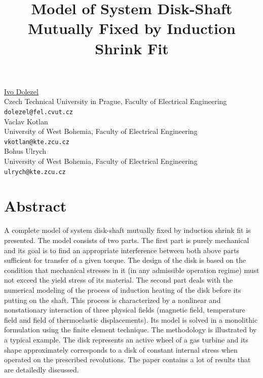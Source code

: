 \documentclass[article,A4,11pt]{llncs}%
\begin{document}
\title{Model of System Disk-Shaft Mutually Fixed by Induction Shrink Fit}
 \author{} \institute{}
\maketitle
\begin{center}
{\large \underline{Ivo Dolezel}}\\
Czech Technical University in Prague, Faculty of Electrical Engineering\\
{\tt dolezel@fel.cvut.cz}
\\ \vspace{4mm}
{\large Vaclav Kotlan}\\
University of West Bohemia, Faculty of Electrical Engineering\\
{\tt vkotlan@kte.zcu.cz}
\\ \vspace{4mm}
{\large Bohus  Ulrych}\\
University of West Bohemia, Faculty of Electrical Engineering\\
{\tt ulrych@kte.zcu.cz}
\end{center}

\section*{Abstract}
A complete model of system disk-shaft mutually fixed by induction shrink fit is presented. The model consists of two parts. The first part is purely mechanical and its goal is to find an appropriate interference between both above parts sufficient for transfer of a given torque. The design of the disk is based on the condition that mechanical stresses in it (in any admissible operation regime) must not exceed the yield stress of its material. The second part deals with the numerical modeling of the process of induction heating of the disk before its putting on the shaft. This process is characterized by a nonlinear and nonstationary interaction of three physical fields (magnetic field, temperature field and field of thermoelastic displacements). Its model is solved in a monolithic formulation using the finite element technique. The methodology is illustrated by a typical example. The disk represents an active wheel of a gas turbine and its shape approximately corresponds to a disk of constant internal stress when operated on the prescribed revolutions. The paper contains a lot of results that are detailedly discussed.
\end{document}
